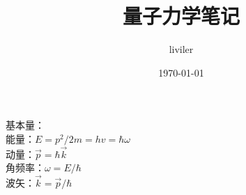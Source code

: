 \documentclass{article}
\title{量子力学笔记}
\author{liviler}
\date{\today}
\begin{document}
\maketitle
基本量：\\
能量：$E=p^2/2m =h v=\hbar \omega $\\
动量：$\vec{p}=\hbar \vec{k}$\\
角频率：$\omega=E/\hbar$\\
波矢：$\vec{k}=\vec{p}/\hbar$



                                                                                                                                                                 
\end{document}
